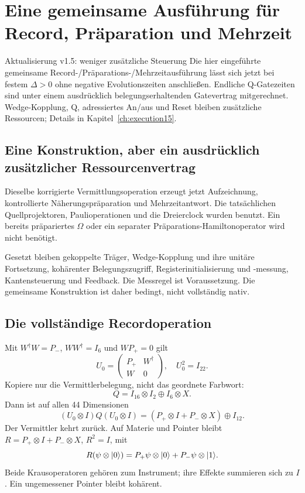 \chapter{Eine gemeinsame Ausführung für Record, Präparation und Mehrzeit}
\label{ch:execution13}
\begin{bild}{Aktualisierung v1.5: weniger zusätzliche Steuerung}
Die hier eingeführte gemeinsame Record-/Präparations-/Mehrzeitausführung lässt sich jetzt bei festem $\Delta>0$ ohne negative Evolutionszeiten anschließen. Endliche Q-Gatezeiten sind unter einem ausdrücklich belegungserhaltenden Gatevertrag mitgerechnet. Wedge-Kopplung, Q, adressiertes An/aus und Reset bleiben zusätzliche Ressourcen; Details in Kapitel~\ref{ch:execution15}.
\end{bild}
\section{Eine Konstruktion, aber ein ausdrücklich zusätzlicher Ressourcenvertrag}
Dieselbe korrigierte Vermittlungsoperation erzeugt jetzt Aufzeichnung, kontrollierte Näherungspräparation und Mehrzeitantwort. Die tatsächlichen Quellprojektoren, Paulioperationen und die Dreierclock wurden benutzt. Ein bereits präpariertes $\Omega$ oder ein separater Präparations-Hamiltonoperator wird nicht benötigt.

Gesetzt bleiben gekoppelte Träger, Wedge-Kopplung und ihre unitäre Fortsetzung, kohärenter Belegungszugriff, Registerinitialisierung und -messung, Kantensteuerung und Feedback. Die Messregel ist Voraussetzung. Die gemeinsame Konstruktion ist daher bedingt, nicht vollständig nativ.

\section{Die vollständige Recordoperation}
Mit $W^\dagger W=P_-$, $WW^\dagger=I_6$ und $WP_+=0$ gilt
\begin{equation}
U_0=\begin{pmatrix}P_+&W^\dagger\\W&0\end{pmatrix},\quad U_0^2=I_{22}.
\end{equation}
Kopiere nur die Vermittlerbelegung, nicht das geordnete Farbwort:
\begin{equation}
Q=I_{16}\otimes I_2\oplus I_6\otimes X.
\end{equation}
Dann ist auf allen 44 Dimensionen
\begin{equation}
(U_0\otimes I)Q(U_0\otimes I)
=(P_+\otimes I+P_-\otimes X)\oplus I_{12}.
\end{equation}
Der Vermittler kehrt zurück. Auf Materie und Pointer bleibt $R=P_+\otimes I+P_-\otimes X$, $R^2=I$, mit
\begin{equation}
R(\psi\otimes\lvert0\rangle)=P_+\psi\otimes\lvert0\rangle+P_-\psi\otimes\lvert1\rangle.
\end{equation}
Beide Krausoperatoren gehören zum Instrument; ihre Effekte summieren sich zu $I$. Ein ungemessener Pointer bleibt kohärent.

